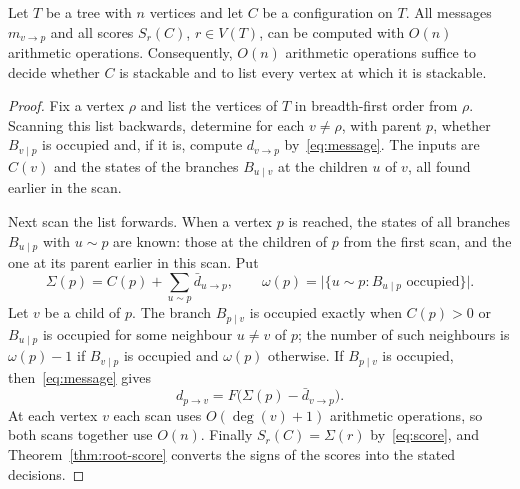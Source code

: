 \begin{corollary}\label{cor:linear-time}
Let $T$ be a tree with $n$ vertices and let $C$ be a configuration on $T$.
All messages $m_{v\to p}$ and all scores $S_r(C)$, $r\in V(T)$, can be
computed with $O(n)$ arithmetic operations. Consequently, $O(n)$ arithmetic
operations suffice to decide whether $C$ is stackable and to list every
vertex at which it is stackable.
\end{corollary}
\begin{proof}
Fix a vertex $\rho$ and list the vertices of $T$ in breadth-first order from
$\rho$. Scanning this list backwards, determine for each $v\ne\rho$, with
parent $p$, whether $B_{v\mid p}$ is occupied and, if it is, compute
$d_{v\to p}$ by~\eqref{eq:message}. The inputs are $C(v)$ and the states
of the branches $B_{u\mid v}$ at the children $u$ of $v$, all found earlier
in the scan.

Next scan the list forwards. When a vertex $p$ is reached, the states of all
branches $B_{u\mid p}$ with $u\sim p$ are known: those at the children of $p$
from the first scan, and the one at its parent earlier in this scan. Put
\[
 \Sigma(p)=C(p)+\sum_{u\sim p}\bar d_{u\to p},
 \qquad
 \omega(p)=\bigl|\{u\sim p:B_{u\mid p}\text{ occupied}\}\bigr|.
\]
Let $v$ be a child of $p$. The branch $B_{p\mid v}$ is occupied exactly when
$C(p)>0$ or $B_{u\mid p}$ is occupied for some neighbour $u\ne v$ of $p$;
the number of such neighbours is $\omega(p)-1$ if $B_{v\mid p}$ is occupied
and $\omega(p)$ otherwise. If $B_{p\mid v}$ is occupied,
then~\eqref{eq:message} gives
\[
 d_{p\to v}=F\bigl(\Sigma(p)-\bar d_{v\to p}\bigr).
\]
At each vertex $v$ each scan uses $O(\deg(v)+1)$ arithmetic operations, so
both scans together use $O(n)$. Finally $S_r(C)=\Sigma(r)$
by~\eqref{eq:score}, and Theorem~\ref{thm:root-score} converts the signs of
the scores into the stated decisions.
\end{proof}
